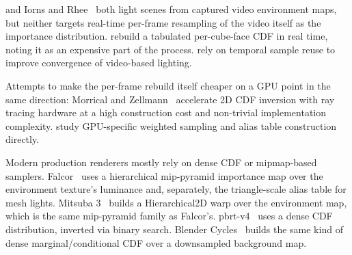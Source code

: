 \documentclass[acmtog,review]{acmart}
\begin{document}
   \cite{havran2005interactive} and Iorns and Rhee~\cite{iorns2015realtime} both light scenes from captured video environment maps, but neither targets real-time per-frame
resampling of the video itself as the importance distribution. \cite{lu2013realtime} rebuild a tabulated per-cube-face CDF in real time, noting it as an expensive part of the process. \cite{kronander2014real} rely on temporal sample reuse to improve convergence of video-based lighting.

Attempts to make the per-frame rebuild itself cheaper on a GPU point in the same direction: Morrical and Zellmann~\cite{morrical2021inverse} accelerate 2D CDF
inversion with ray tracing hardware at a high construction cost and non-trivial implementation
complexity. \cite{lehmann2021weighted} study GPU-specific weighted sampling and alias table construction directly. 

Modern production renderers mostly rely on dense CDF or mipmap-based samplers. {Falcor}~\cite{falcorsoftware} uses a hierarchical mip-pyramid importance map over the environment texture's luminance and, separately,
the triangle-scale alias table for mesh lights. {Mitsuba 3}~\cite{nimierdavid2019mitsuba2} builds a {Hierarchical2D} warp over
the environment map, which is the same mip-pyramid family as Falcor's. {pbrt-v4}~\cite{pharr2023pbrt}
uses a dense CDF distribution, inverted via binary search. {Blender Cycles}~\cite{cyclessoftware} builds the same
kind of dense marginal/conditional CDF over a downsampled background map.
\end{document}
